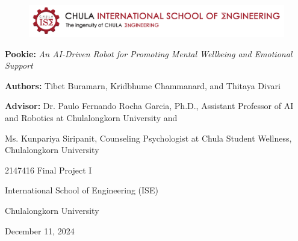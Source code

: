 \documentclass[a4paper,10pt]{article}
\begin{document}
\begin{titlepage}
    \centering  
    \begin{figure}[ht]
        \centering
        \includegraphics[width=\textwidth]{ise-logo.png}
    \end{figure}
    \vspace*{2cm} 
    
    {\Huge \textbf{Pookie:} \textit{An AI-Driven Robot for Promoting Mental Wellbeing and Emotional Support} \par}
    \vspace{4cm}
    
    {\large \textbf{Authors:} Tibet Buramarn, Kridbhume Chammanard, and Thitaya Divari \par}
    \vspace{1cm}
    {\large \textbf{Advisor:} Dr. Paulo Fernando Rocha Garcia, Ph.D., Assistant Professor of AI and Robotics at Chulalongkorn University and \par}
    {\large Ms. Kunpariya Siripanit, Counseling Psychologist at Chula Student Wellness, Chulalongkorn University \par}

    \vspace{3cm}
    
    {\large 2147416 Final Project I \par}
    {\large International School of Engineering (ISE) \par}
    {\large Chulalongkorn University \par}
    
    \vspace{2cm}
    
    {\large December 11, 2024 \par}
    
    \vspace*{\fill}
\end{titlepage}

\thispagestyle{empty}
\end{document}
